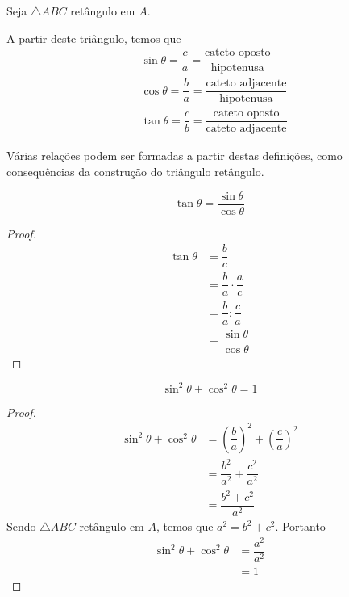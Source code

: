 \begin{df}
Seja $\triangle ABC$ retângulo em $A$.
\begin{figure}[H]
	\centering
\end{figure}


A partir deste triângulo, temos que 
\begin{align*}
&\sin \theta = \dfrac{c}{a}=\dfrac{\text{cateto oposto}}{\text{hipotenusa}}\\
&\cos \theta = \dfrac{b}{a}=\dfrac{\text{cateto adjacente}}{\text{hipotenusa}}\\
&\tan \theta = \dfrac{c}{b}=\dfrac{\text{cateto oposto}}{\text{cateto adjacente}}
\end{align*}
\end{df}
Várias relações podem ser formadas a partir destas definições, como consequências da construção do triângulo retângulo. 
\begin{prop}
\[\tan \theta = \dfrac{\sin \theta}{\cos \theta}\]
\begin{proof}
\begin{align*}
\tan \theta &= \dfrac{b}{c} \\
&=\dfrac{b}{a} \cdot \dfrac{a}{c} \\
&= \dfrac{b}{a} : \dfrac{c}{a} \\
&= \dfrac{\sin \theta}{\cos \theta}
\end{align*}
\end{proof}
\end{prop}
\begin{prop}
\[\sin^2 \theta + \cos^2 \theta = 1\]
\begin{proof}
\begin{align*}
\sin^2\theta + \cos^2\theta &= \left(\dfrac{b}{a}\right)^2 + \left( \dfrac{c}{a}\right)^2 \\
&= \dfrac{b^2}{a^2}+\dfrac{c^2}{a^2}\\
&= \dfrac{b^2 + c^2}{a^2}
\end{align*}
Sendo $\triangle ABC$ retângulo em $A$, temos que $a^2=b^2+c^2$. Portanto
\begin{align*}
\sin^2\theta + \cos^2\theta &=\dfrac{a^2}{a^2} \\
&= 1
\end{align*}
\end{proof}
\end{prop}
